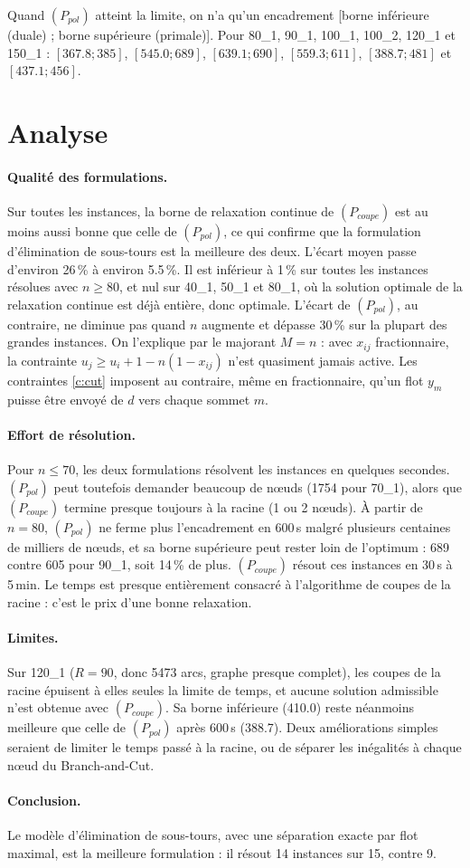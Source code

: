 \documentclass[11pt]{article}
\begin{document}
Quand $(P_{pol})$ atteint la limite, on n'a qu'un encadrement [borne inférieure (duale) ;
borne supérieure (primale)]. Pour 80\_1, 90\_1, 100\_1, 100\_2, 120\_1 et 150\_1 : $[367.8 ; 385]$, $[545.0 ; 689]$, $[639.1 ; 690]$,
$[559.3 ; 611]$, $[388.7 ; 481]$ et $[437.1 ; 456]$.

\section{Analyse}

\paragraph{Qualité des formulations.} Sur toutes les instances, la borne de relaxation
continue de $(P_{coupe})$ est au moins aussi bonne que celle de $(P_{pol})$, ce qui
confirme que la formulation d'élimination de sous-tours est la meilleure des deux.
L'écart moyen passe d'environ 26\,\% à environ 5.5\,\%. Il est inférieur à 1\,\% sur
toutes les instances résolues avec $n\ge 80$, et nul sur 40\_1, 50\_1 et 80\_1, où la
solution optimale de la relaxation continue est déjà entière, donc optimale.
L'écart de $(P_{pol})$, au contraire, ne diminue pas quand $n$ augmente et dépasse
30\,\% sur la plupart des grandes instances. On l'explique par le majorant $M=n$ : avec
$x_{ij}$ fractionnaire, la contrainte $u_j\ge u_i+1-n(1-x_{ij})$ n'est quasiment jamais
active. Les contraintes \eqref{c:cut} imposent au contraire,
même en fractionnaire, qu'un flot $y_m$ puisse être envoyé de $d$ vers chaque sommet $m$.

\paragraph{Effort de résolution.} Pour $n\le 70$, les deux formulations résolvent les
instances en quelques secondes. $(P_{pol})$ peut toutefois demander beaucoup de nœuds
(1754 pour 70\_1), alors que $(P_{coupe})$ termine presque toujours à la racine (1 ou 2
nœuds). À partir de $n=80$, $(P_{pol})$ ne ferme plus l'encadrement en 600\,s malgré
plusieurs centaines de milliers de nœuds, et sa borne supérieure peut rester loin de
l'optimum : 689 contre 605 pour 90\_1, soit 14\,\% de plus. $(P_{coupe})$ résout ces
instances en 30\,s à 5\,min. Le temps est presque entièrement consacré à l'algorithme de
coupes de la racine : c'est le prix d'une bonne relaxation.

\paragraph{Limites.} Sur 120\_1
($R=90$, donc 5473 arcs, graphe presque complet), les coupes de la racine épuisent à elles seules
la limite de temps, et aucune solution admissible n'est obtenue avec $(P_{coupe})$. Sa
borne inférieure (410.0) reste néanmoins meilleure que celle de $(P_{pol})$ après 600\,s
(388.7). Deux améliorations simples seraient de limiter le temps passé à la racine, ou
de séparer les inégalités à chaque nœud du Branch-and-Cut.

\paragraph{Conclusion.} Le modèle d'élimination de sous-tours, avec une séparation exacte
par flot maximal, est la meilleure formulation : il résout 14 instances sur 15, contre 9.
\end{document}
